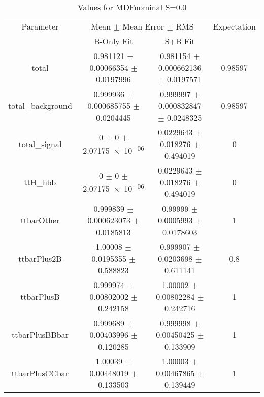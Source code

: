 \begin{table}
\centering
\caption{Values for MDFnominal S=0.0}
\begin{tabular}{cccc}
\toprule
Parameter & \multicolumn{2}{c}{Mean $\pm$ Mean Error $\pm$ RMS} & Expectation\\
 & B-Only Fit & S+B Fit & \\
\midrule
total & \num{0.981121} $\pm$ \num{0.00066354} $\pm$ \num{0.0197996} & \num{0.981154} $\pm$ \num{0.000662136} $\pm$ \num{0.0197571} & \num{0.98597}\\
total\_background & \num{0.999936} $\pm$ \num{0.000685755} $\pm$ \num{0.0204445} & \num{0.999997} $\pm$ \num{0.000832847} $\pm$ \num{0.0248325} & \num{0.98597}\\
total\_signal & \num{0} $\pm$ \num{0} $\pm$ \num{2.07175e-06} & \num{0.0229643} $\pm$ \num{0.018276} $\pm$ \num{0.494019} & \num{0}\\
ttH\_hbb & \num{0} $\pm$ \num{0} $\pm$ \num{2.07175e-06} & \num{0.0229643} $\pm$ \num{0.018276} $\pm$ \num{0.494019} & \num{0}\\
ttbarOther & \num{0.999839} $\pm$ \num{0.000623073} $\pm$ \num{0.0185813} & \num{0.99999} $\pm$ \num{0.0005993} $\pm$ \num{0.0178603} & \num{1}\\
ttbarPlus2B & \num{1.00008} $\pm$ \num{0.0195355} $\pm$ \num{0.588823} & \num{0.999907} $\pm$ \num{0.0203698} $\pm$ \num{0.611141} & \num{0.8}\\
ttbarPlusB & \num{0.999974} $\pm$ \num{0.00802002} $\pm$ \num{0.242158} & \num{1.00002} $\pm$ \num{0.00802284} $\pm$ \num{0.242716} & \num{1}\\
ttbarPlusBBbar & \num{0.999689} $\pm$ \num{0.00403996} $\pm$ \num{0.120285} & \num{0.999998} $\pm$ \num{0.00450425} $\pm$ \num{0.133909} & \num{1}\\
ttbarPlusCCbar & \num{1.00039} $\pm$ \num{0.00448019} $\pm$ \num{0.133503} & \num{1.00003} $\pm$ \num{0.00467865} $\pm$ \num{0.139449} & \num{1}\\
\bottomrule
\end{tabular}
\end{table}